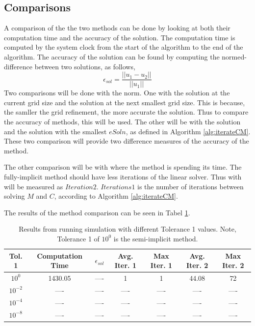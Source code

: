 \documentclass{article}
\theoremstyle{plain}
\begin{document}
  \subsection{Comparisons}
    A comparison of the the two methods can be done by looking at both their computation time and the accuracy of the solution.
    The computation time is computed by the system clock from the start of the algorithm to the end of the algorithm. 
    The accuracy of the solution can be found by computing the normed-difference between two solutions, as follows,
    \begin{equation}
      \epsilon_{sol} = \frac{||u_1 - u_2||}{||u_1||}
    \end{equation}
    Two comparisons will be done with the norm. 
    One with the solution at the current grid size and the solution at the next smallest grid size.
    This is because, the samller the grid refinement, the more accurate the solution. 
    Thus to compare the accuracy of methods, this will be used.
    The other will be with the solution and the solution with the smallest $eSoln$, as defined in Algorithm \ref{alg:iterateCM}.
    These two comparison will provide two difference measures of the accuracy of the method.

    The other comparison will be with where the method is spending its time.
    The fully-implicit method should have less iterations of the linear solver.
    Thus with will be measured as $Iteration 2$. 
    $Iterations 1$ is the number of iterations between solving $M$ and $C$, according to Algorithm \ref{alg:iterateCM}.
    
    The results of the method comparison can be seen in Tabel \ref{tab:tolerance_comparison}.
    
    \begin{table}[h!tb]
      \begin{center}
      \begin{tabular}{|c|c|c|c|c|c|c|}
        \hline
        Tol. 1 & Computation Time & $\epsilon_{sol}$ & Avg. Iter. 1 & Max Iter. 1 & Avg. Iter. 2 & Max Iter. 2 \\
        \hline
        $10^{0}$ & 1430.05 & ---- & 1 & 1 & 44.08 & 72 \\
        $10^{-2}$ & ---- & ---- & ---- & ---- & ---- & ---- \\
        $10^{-4}$ & ---- & ---- & ---- & ---- & ---- & ---- \\
        $10^{-8}$ & ---- & ---- & ---- & ---- & ---- & ---- \\
        \hline
      \end{tabular}
      \caption{Results from running simulation with different Tolerance 1 values. Note, Tolerance 1 of $10^{0}$ is the semi-implicit method.}
      \label{tab:tolerance_comparison}
      \end{center}
    \end{table}
\end{document}
